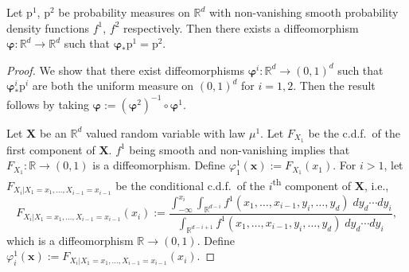 \documentclass[10pt,a4paper]{amsart}
\newcommand{\R}{\mathbb R}
\newcommand{\inv}{^{-1}}
\begin{document}
\begin{lemma}\label{lem:mapping-distributions}
    Let $\mathrm p^1$, $\mathrm p^2$ be probability measures on $\R^d$ with non-vanishing smooth probability density functions $f^1$, $f^2$ respectively. Then there exists a diffeomorphism $\bm\varphi\colon\R^d\to\R^d$ such that $\bm\varphi_*\mathrm p^1 = \mathrm p^2$.
\end{lemma}

\begin{proof}
    We show that there exist diffeomorphisms $\bm\varphi^i\colon \R^d\to (0,1)^d$ such that $\bm\varphi^i_*\mathrm p^i$ are both  the uniform measure on $(0,1)^d$ for $i=1,2$. Then the result follows by taking $\bm\varphi := (\bm\varphi^2)\inv\circ\bm \varphi^1$.
    
    Let $\bm X$ be an $\R^d$ valued random variable with law $\mu^1$. Let $F_{X_1}$ be the c.d.f.~of the first component of $\bm X$. $f^1$ being smooth and non-vanishing implies that $F_{X_1}\colon \R\to (0,1)$ is a diffeomorphism. Define $\varphi^1_1(\bm x) := F_{X_1}(x_1)$. For $i>1$, let $F_{X_i|X_1=x_1,\dots,X_{i-1}=x_{i-1}}$ be the conditional c.d.f.~of the $i$\textsuperscript{th} component of $\bm X$, i.e.,
    \[
        F_{X_i|X_1=x_1,\dots,X_{i-1}=x_{i-1}}(x_i) := \frac{\int_{-\infty}^{x_i}\int_{\R^{d-i}}f^1(x_1,\dots,x_{i-1}, y_i,\dots, y_d)\;dy_d\cdots dy_i}{\int_{\R^{d-i+1}}f^1(x_1,\dots,x_{i-1}, y_i,\dots, y_d)\;dy_d\cdots dy_i},
    \]
    which is a diffeomorphism $\R\to(0,1)$. Define $\varphi^1_i(\bm x) := F_{X_i|X_1=x_1,\dots,X_{i-1}=x_{i-1}}(x_i)$.


\end{proof}
\end{document}
